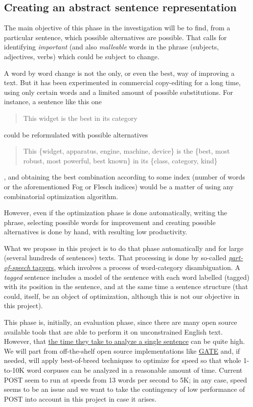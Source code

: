 \documentclass[a4paper,12pt,twocolumn]{article}
\begin{document}
\subsection{Creating an abstract sentence representation}

The main objective of this phase in the investigation will be to find,
from a particular sentence, which possible alternatives are
possible. That calls for identifying {\em important} (and also {\em malleable} words in the
phrase (subjects, adjectives, verbs) which could be subject to
change. 

A word by word change is not the only, or even the best, way of
improving a text. But it has been experimented in commercial
copy-editing for a long time, using only certain words and a limited
amount of possible substitutions. For instance, a sentence like this
one
\begin{quote}
This widget is the best in its category
\end{quote}
could be reformulated with possible alternatives
\begin{quote}
This \{widget, apparatus, engine, machine, device\} is the \{best, most
  robust, most powerful, best known\} in its \{class, category, kind\}
\end{quote}
, and obtaining the best combination according to some index (number
of words or the aforementioned Fog or Flesch indices) would be a
matter of using any combinatorial optimization algorithm.

However, even if the optimization phase is done automatically, writing
the phrase, selecting possible words for improvement and creating
possible alternatives is done by hand, with resulting low
productivity. 

What we propose in this project is to do that phase automatically and
for large (several hundreds of sentences) texts. That processing is
done by so-called \href{http://en.wikipedia.org/wiki/Part-of-speech_tagging}{{\em part-of-speech} taggers}, which involves a
process of word-category disambiguation. A {\em tagged} sentence
includes a model of the sentence with each word labelled (tagged) with
its position in the sentence, and at the same time a sentence
structure (that could, itself, be an object of optimization, although
this is not our objective in this project).

This phase is, initially, an evaluation phase, since there are many
open source available tools that are able to perform it on
unconstrained English text. However, that \href{http://mattwilkens.com/2008/11/08/evaluating-pos-taggers-speed/}{the time they take to analyze a single sentence} can be quite
high. We will part from off-the-shelf open source implementations like
\href{http://gate.ac.uk/wiki/twitter-postagger.html}{GATE} and, if needed, will
apply best-of-breed techniques to optimize for speed so that whole
1-to-10K word corpuses can be analyzed in a reasonable amount of
time. Current POST seem to run at speeds from 13 words per second to
5K; in any case, speed seems to be an issue and we want to take the
contingency of low performance of POST into account in this project in
case it arises. 
\end{document}

